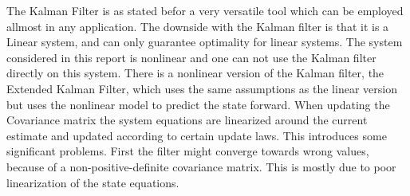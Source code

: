 	The Kalman Filter is as stated befor a very versatile tool which can be employed allmost in any application. The downside with the Kalman filter is that it is a Linear system, and can only guarantee optimality for linear systems. The system considered in this report is nonlinear and one can not use the Kalman filter directly on this system. There is a nonlinear version of the Kalman filter, the Extended Kalman Filter, which uses the same assumptions as the linear version but uses the nonlinear model to predict the state forward. When updating the Covariance matrix the system equations are linearized around the current estimate and updated according to certain update laws. This introduces some significant problems. First the filter might converge towards wrong values, because of a non-positive-definite covariance matrix. This is mostly due to poor linearization of the state equations. \cite{kalman}
	
	
	


